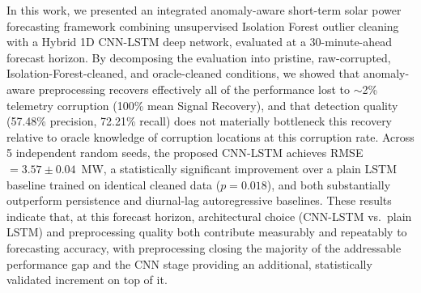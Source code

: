 \documentclass[conference]{IEEEtran}
\begin{document}
In this work, we presented an integrated anomaly-aware short-term solar power forecasting framework combining unsupervised Isolation Forest outlier cleaning with a Hybrid 1D CNN-LSTM deep network, evaluated at a 30-minute-ahead forecast horizon. By decomposing the evaluation into pristine, raw-corrupted, Isolation-Forest-cleaned, and oracle-cleaned conditions, we showed that anomaly-aware preprocessing recovers effectively all of the performance lost to $\sim$2\% telemetry corruption (100\% mean Signal Recovery), and that detection quality (57.48\% precision, 72.21\% recall) does not materially bottleneck this recovery relative to oracle knowledge of corruption locations at this corruption rate. Across 5 independent random seeds, the proposed CNN-LSTM achieves RMSE $=3.57\pm0.04$~MW, a statistically significant improvement over a plain LSTM baseline trained on identical cleaned data ($p=0.018$), and both substantially outperform persistence and diurnal-lag autoregressive baselines. These results indicate that, at this forecast horizon, architectural choice (CNN-LSTM vs.\ plain LSTM) and preprocessing quality both contribute measurably and repeatably to forecasting accuracy, with preprocessing closing the majority of the addressable performance gap and the CNN stage providing an additional, statistically validated increment on top of it.
\end{document}
